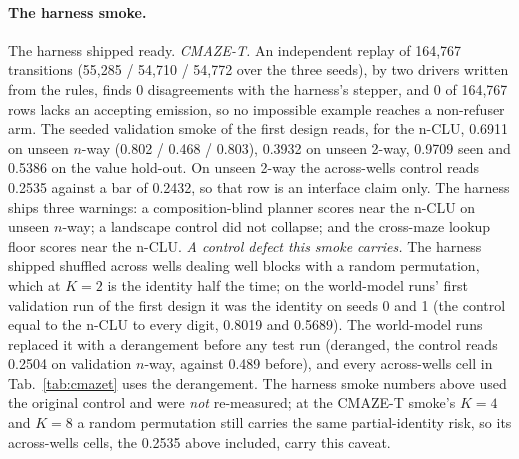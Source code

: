 \documentclass{article} %
\begin{document}
\paragraph{The harness smoke.} The harness shipped ready.
\emph{CMAZE-T.} An independent replay of 164,767 transitions (55,285 / 54,710 / 54,772 over the
three seeds), by two drivers written from the rules, finds 0 disagreements with the harness's
stepper, and 0 of 164,767 rows lacks an accepting emission, so no impossible example reaches a
non-refuser arm. The seeded validation smoke of the first design reads, for the n-CLU,
0.6911 on unseen $n$-way (0.802 / 0.468 / 0.803), 0.3932 on unseen 2-way, 0.9709 seen and 0.5386
on the value hold-out. On unseen 2-way the across-wells control reads 0.2535 against a bar of
0.2432, so that row is an interface claim only. The harness ships three warnings: a composition-blind planner scores near the
n-CLU on unseen $n$-way; a landscape control did not collapse; and the cross-maze lookup floor
scores near the n-CLU.
\emph{A control defect this smoke carries.} The harness shipped
shuffled across wells dealing well blocks with a random permutation, which at
$K=2$ is the identity half the time; on the world-model runs' first validation run of the first design it was
the identity on seeds 0 and 1 (the control equal to the n-CLU to every digit, 0.8019 and 0.5689).
The world-model runs replaced it with a derangement before any test run (deranged, the control
reads 0.2504 on validation $n$-way, against 0.489 before), and every across-wells cell in
Tab.~\ref{tab:cmazet} uses the derangement. The harness smoke numbers above
used the original control and were \emph{not} re-measured; at the CMAZE-T smoke's $K=4$ and $K=8$ a
random permutation still carries the same partial-identity risk, so its across-wells cells,
the 0.2535 above included, carry this caveat.
\end{document}
